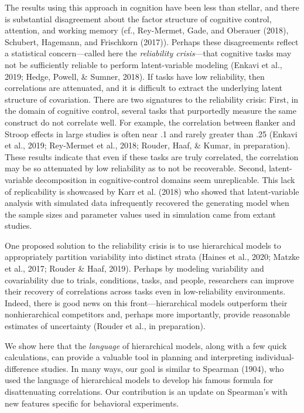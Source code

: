 \documentclass[
  ,man]{apa6}
\begin{document}
The results using this approach in cognition have been less than stellar, and there is substantial disagreement about the factor structure of cognitive control, attention, and working memory (cf., Rey-Mermet, Gade, and Oberauer (2018), Schubert, Hagemann, and Frischkorn (2017)). Perhaps these disagreements reflect a statistical concern---called here the \emph{reliability crisis}---that cognitive tasks may not be sufficiently reliable to perform latent-variable modeling (Enkavi et al., 2019; Hedge, Powell, \& Sumner, 2018). If tasks have low reliability, then correlations are attenuated, and it is difficult to extract the underlying latent structure of covariation. There are two signatures to the reliability crisis: First, in the domain of cognitive control, several tasks that purportedly measure the same construct do not correlate well. For example, the correlation between flanker and Stroop effects in large studies is often near .1 and rarely greater than .25 (Enkavi et al., 2019; Rey-Mermet et al., 2018; Rouder, Haaf, \& Kumar, in preparation). These results indicate that even if these tasks are truly correlated, the correlation may be so attenuated by low reliability as to not be recoverable. Second, latent-variable decomposition in cognitive-control domains seem unreplicable. This lack of replicability is showcased by Karr et al. (2018) who showed that latent-variable analysis with simulated data infrequently recovered the generating model when the sample sizes and parameter values used in simulation came from extant studies.

One proposed solution to the reliability crisis is to use hierarchical models to appropriately partition variability into distinct strata (Haines et al., 2020; Matzke et al., 2017; Rouder \& Haaf, 2019). Perhaps by modeling variability and covariability due to trials, conditions, tasks, and people, researchers can improve their recovery of correlations across tasks even in low-reliability environments. Indeed, there is good news on this front---hierarchical models outperform their nonhierarchical competitors and, perhaps more importantly, provide reasonable estimates of uncertainty (Rouder et al., in preparation).

We show here that the \emph{language} of hierarchical models, along with a few quick calculations, can provide a valuable tool in planning and interpreting individual-difference studies. In many ways, our goal is similar to Spearman (1904), who used the language of hierarchical models to develop his famous formula for disattenuating correlations. Our contribution is an update on Spearman's with new features specific for behavioral experiments.
\end{document}
